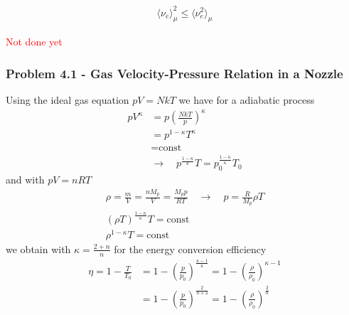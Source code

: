 \documentclass[10pt,a4paper]{article}
\theoremstyle{definition}
\begin{document}
\begin{align}
    \langle \nu_e\rangle_\mu^2\le\langle \nu_e^2\rangle_\mu    
\end{align}

\textcolor{red}{Not done yet}

\subsubsection{Problem 4.1 - Gas Velocity-Pressure Relation in a Nozzle}
Using the ideal gas equation $pV=NkT$ we have for a adiabatic process
\begin{align}
    pV^\kappa&=p\left(\frac{NkT}{p}\right)^\kappa\\
    &=p^{1-\kappa}T^\kappa\\
    &=\text{const}\\
    &\rightarrow\quad p^\frac{1-\kappa}{\kappa}T=p_0^\frac{1-\kappa}{\kappa}T_0
\end{align}
and with $pV=nRT$
\begin{align}
    \rho=\frac{m}{V}=\frac{nM_p}{V}=\frac{M_pp}{RT}\quad\rightarrow\quad p=\frac{R}{M_p}\rho T\\
    (\rho T)^\frac{1-\kappa}{\kappa}T=\text{const}\\
    \rho^{1-\kappa}T=\text{const}
\end{align}
we obtain with $\kappa=\frac{2+n}{n}$ for the energy conversion efficiency 
\begin{align}
    \eta=1-\frac{T}{T_0}&=1-\left(\frac{p}{p_0}\right)^\frac{\kappa-1}{\kappa}=1-\left(\frac{\rho}{\rho_0}\right)^{\kappa-1}\\
    &=1-\left(\frac{p}{p_0}\right)^\frac{2}{n+2}=1-\left(\frac{\rho}{\rho_0}\right)^\frac{2}{n}\\
\end{align}

\newpage
\end{document}
